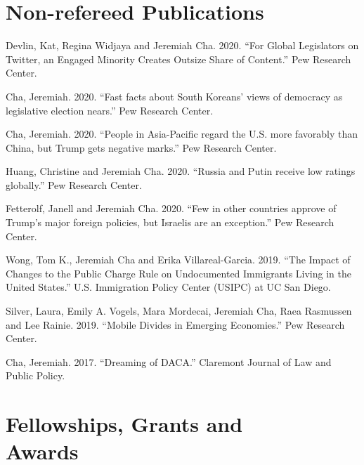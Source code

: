 \documentclass[margin, line]{res}
\begin{document}
\begin{resume}
\section{Non-refereed Publications}
\begin{etaremune}
	\item Devlin, Kat, Regina Widjaya and Jeremiah Cha. 2020. ``For Global Legislators on Twitter, an Engaged Minority Creates Outsize Share of Content.'' Pew Research Center.
	\item Cha, Jeremiah. 2020. ``Fast facts about South Koreans’ views of democracy as legislative election nears.'' Pew Research Center.
	\item Cha, Jeremiah. 2020. ``People in Asia-Pacific regard the U.S. more favorably than China, but Trump gets negative marks.'' Pew Research Center.
	\item Huang, Christine and Jeremiah Cha. 2020. ``Russia and Putin receive low ratings globally.'' Pew Research Center.
	\item Fetterolf, Janell and Jeremiah Cha. 2020. ``Few in other countries approve of Trump’s major foreign policies, but Israelis are an exception.'' Pew Research Center.
	\item Wong, Tom K., Jeremiah Cha and Erika Villareal-Garcia. 2019. ``The Impact of Changes to the Public Charge Rule on Undocumented Immigrants Living in the United States.'' U.S. Immigration Policy Center (USIPC) at UC San Diego.
	\item Silver, Laura, Emily A. Vogels, Mara Mordecai, Jeremiah Cha, Raea Rasmussen and Lee Rainie. 2019. ``Mobile Divides in Emerging Economies.'' Pew Research Center.
	\item Cha, Jeremiah. 2017. ``Dreaming of DACA.'' Claremont Journal of Law and Public Policy.
\end{etaremune}


\section{Fellowships, Grants and \\Awards}



\end{resume}
\end{document}

